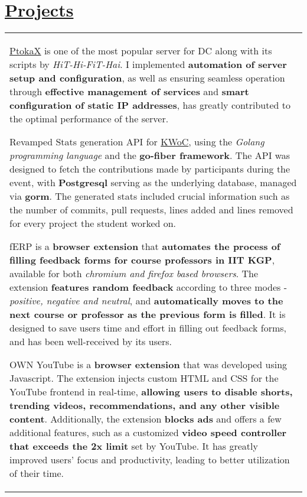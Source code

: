 \documentclass[a4paper,10pt]{extarticle} %
\begin{document}
\section{\textcolor{primary}{\href{https://www.github.com/proffapt}{Projects}}}
 \vspace{-0.5cm}
\begin{tabular}{p{19.7cm}}
\begin{description}[style=nextline, font=$\bullet$\hspace{2mm}\normalsize]

\item[{\href{https://github.com/sheharyaar/ptokax}{MetaHub}}]
\href{http://www.ptokax.org/}{PtokaX} is one of the most popular server for DC along with its scripts by \textit{HiT-Hi-FiT-Hai}. I implemented \textbf{automation of server setup and configuration}, as well as ensuring seamless operation through \textbf{effective management of services} and \textbf{smart configuration of static IP addresses}, has greatly contributed to the optimal performance of the server.

 \item[KWoC Stats API] 
Revamped Stats generation API for {\href{https://kwoc.kossiitkgp.org}{KWoC}}, using the \textit{Golang programming language} and the \textbf{go-fiber framework}. The API was designed to fetch the contributions made by participants during the event, with \textbf{Postgresql} serving as the underlying database, managed via \textbf{gorm}. The generated stats included crucial information such as the number of commits, pull requests, lines added and lines removed for every project the student worked on.

\item[{\href{https://github.com/proffapt/fERP}{fERP}}]
fERP is a \textbf{browser extension} that \textbf{automates the process of filling feedback forms for course professors in IIT KGP}, available for both \textit{chromium and firefox based browsers}. The extension \textbf{features random feedback} according to three modes - \textit{positive, negative and neutral}, and \textbf{automatically moves to the next course or professor as the previous form is filled}. It is designed to save users time and effort in filling out feedback forms, and has been well-received by its users.
 
 \item[{\href{https://github.com/proffapt/own-youtube}{Own YouTube}}] 
OWN YouTube is a \textbf{browser extension} that was developed using Javascript. The extension injects custom HTML and CSS for the YouTube frontend in real-time, \textbf{allowing users to disable shorts, trending videos, recommendations, and any other visible content}. Additionally, the extension \textbf{blocks ads} and offers a few additional features, such as a customized \textbf{video speed controller that exceeds the 2x limit} set by YouTube. It has greatly improved users' focus and productivity, leading to better utilization of their time.
 

\end{description}
\end{tabular}
\end{document}
